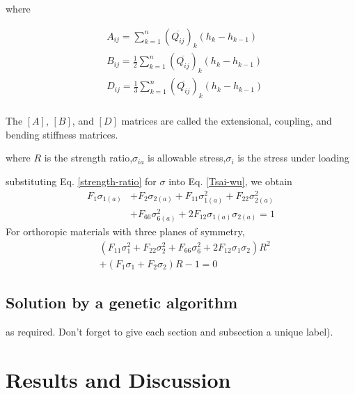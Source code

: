 \documentclass[smallextended]{svjour3}       %
\begin{document}
where

\begin{equation}
    \begin{split}
    &A_{ij}
	=
	\sum_{k=1}^n(\overline{Q_{ij}})_k(h_k-h_{k-1}) \\
    &B_{ij}
	=
	\frac{1}{2}\sum_{k=1}^n(\overline{Q_{ij}})_k(h_k-h_{k-1}) \\
    &D_{ij}
	=
	\frac{1}{3}\sum_{k=1}^n(\overline{Q_{ij}})_k(h_k-h_{k-1}) \\
    \end{split}
\end{equation}

The $[A]$, $[B]$, and $[D]$ matrices are called the extensional, coupling, and bending stiffness
matrices.






where $R$ is the strength ratio,$\sigma_{i{a}}$ is allowable stress,$\sigma_i$ is the stress under loading

substituting Eq.  \ref{strength-ratio} for $\sigma$ into Eq. \ref{Tsai-wu}, we obtain
\begin{equation*}
	\begin{split}
		F_1\sigma_{1(a)}&+F_2\sigma_{2(a)}+F_{11}\sigma_{1(a)}^2+F_{22}\sigma_{2(a)}^2 \\
						&+F_{66}\sigma_{6(a)}^2+2F_{12}\sigma_{1(a)}\sigma_{2(a)}=1
    \end{split}
\end{equation*}
For orthoropic materials with three planes of symmetry, 
\begin{equation*}\label{Tsai-wu}
	\begin{split}
		&(F_{11}\sigma_1^2+F_{22}\sigma_2^2+F_{66}\sigma_6^2+2F_{12}\sigma_1\sigma_2)R^2 \\
		&+(F_1\sigma_1+F_2\sigma_2)R-1=0 
    \end{split}
\end{equation*}



\subsection{Solution by a genetic algorithm}\label{sec:2}
as required. Don't forget to give each section
and subsection a unique label).




\section{Results and Discussion}
\end{document}
